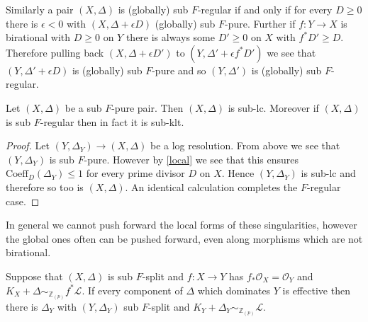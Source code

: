 \documentclass[a4paper,12pt]{book}
\newcommand{\ox}{\mathcal{O}_{X}}
\newcommand{\zp}{\mathbb{Z}_{(p)}}
\begin{document}
Similarly a pair $(X,\Delta)$ is (globally) sub $F$-regular if and only if for every $D \geq 0$ there is $\epsilon<0$ with $(X,\Delta+\epsilon D)$ (globally) sub $F$-pure. Further if $f:Y \to X$ is birational with $D \geq 0$ on $Y$ there is always some $D' \geq 0$ on $X$  with $f^{*}D' \geq D$. Therefore pulling back $(X,\Delta +\epsilon D')$ to $(Y,\Delta'+\epsilon f^{*}D')$ we see that  $(Y,\Delta'+\epsilon D)$ is (globally) sub $F$-pure and so $(Y,\Delta')$ is (globally) sub $F$-regular.


\begin{theorem}
	
	Let $(X,\Delta)$ be a sub $F$-pure pair. Then $(X,\Delta)$ is sub-lc. Moreover if $(X,\Delta)$ is sub $F$-regular then in fact it is sub-klt.
	
\end{theorem}

\begin{proof}
		Let $(Y,\Delta_{Y}) \to (X,\Delta)$ be a log resolution. From above we see that $(Y,\Delta_{Y})$ is sub $F$-pure. However by \autoref{local} we see that this ensures $\text{Coeff}_{D}(\Delta_{Y}) \leq 1$ for every prime divisor $D$ on $X$. Hence $(Y,\Delta_{Y})$ is sub-lc and therefore so too is $(X,\Delta)$. An identical calculation completes the $F$-regular case.
\end{proof}

In general we cannot push forward the local forms of these singularities, however the global ones often can be pushed forward, even along morphisms which are not birational.

\begin{lemma}
	Suppose that $(X,\Delta)$ is sub $F$-split and $f:X \to Y$ has $f_{*}\ox =\mathcal{O}_{Y}$ and $K_{X}+\Delta \sim_{\zp} f^{*}\mathcal{L}$. If every component of $\Delta$ which dominates $Y$ is effective then there is $\Delta_{Y}$ with $(Y,\Delta_{Y})$ sub $F$-split and $K_{Y}+\Delta_{Y} \sim_{\zp} \mathcal{L}$.
\end{lemma}
\end{document}
